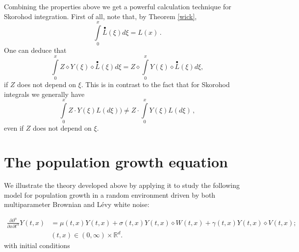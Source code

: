 \documentclass[12pt]{article}%
\numberwithin{equation}{section}
\begin{document}
Combining the properties above we get a powerful calculation technique for Skorohod 
integration. First of all, note that, by Theorem \ref{wick},
\begin{equation}
\int\limits_{0}^{x}\overset{\bullet}{L}(\xi)d\xi=L({x})\,. \label{3.63}%
\end{equation}
One can deduce that
\begin{equation}
\int\limits_{0}^{x}Z\diamond Y({\xi})\diamond\overset{\bullet}{L}({\xi})d\xi
=Z\diamond\int\limits_{0}^{x}Y({\xi})\diamond\overset{\bullet}{L}({\xi})d\xi,
\label{3.64}%
\end{equation}
if $Z$ does not depend on $\xi$. This is in contrast to the fact that for Skorohod
integrals we generally have
\begin{equation}
\int\limits_{0}^{x}Z\cdot Y({\xi})L(d\xi))\not =Z\cdot\int\limits_{0}%
^{x}Y({\xi})L(d\xi)\,, \label{3.65}%
\end{equation}
even if $Z$ does not depend on $\xi$.





\section{The population growth equation}
We illustrate the theory developed above by applying it to study the following model for population growth in a random environment driven by both multiparameter Brownian and  L\' evy white noise:

\begin{align}\label{heatgrowth}
 	 \frac{\partial \partial^{\alpha}}{\partial x\partial t^{\alpha}}Y(t,x)&= \mu(t,x) Y(t,x)+\sigma(t,x)Y(t,x) \diamond W(t,x)+\gamma(t,x)Y(t,x)\diamond V(t,x);\nonumber\\
     & (t,x)\in (0,\infty)\times \mathbb{R}^{d}.
 	 	\end{align}
with initial conditions
\end{document}
